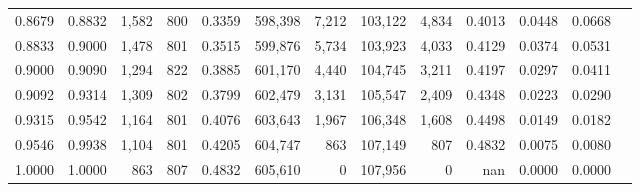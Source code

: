 \begin{tabular}{rrrrrrrrrrrrr}
0.8679 & 0.8832 &  1,582 &   800 &                                     0.3359 & 598,398 &   7,212 & 103,122 &   4,834 & 0.4013 & 0.0448 & 0.0668 \\
0.8833 & 0.9000 &  1,478 &   801 &                                     0.3515 & 599,876 &   5,734 & 103,923 &   4,033 & 0.4129 & 0.0374 & 0.0531 \\
0.9000 & 0.9090 &  1,294 &   822 &                                     0.3885 & 601,170 &   4,440 & 104,745 &   3,211 & 0.4197 & 0.0297 & 0.0411 \\
0.9092 & 0.9314 &  1,309 &   802 &                                     0.3799 & 602,479 &   3,131 & 105,547 &   2,409 & 0.4348 & 0.0223 & 0.0290 \\
0.9315 & 0.9542 &  1,164 &   801 &                                     0.4076 & 603,643 &   1,967 & 106,348 &   1,608 & 0.4498 & 0.0149 & 0.0182 \\
0.9546 & 0.9938 &  1,104 &   801 &                                     0.4205 & 604,747 &     863 & 107,149 &     807 & 0.4832 & 0.0075 & 0.0080 \\
1.0000 & 1.0000 &    863 &   807 &                                     0.4832 & 605,610 &       0 & 107,956 &       0 &    nan & 0.0000 & 0.0000 \\
\bottomrule
\end{tabular}
